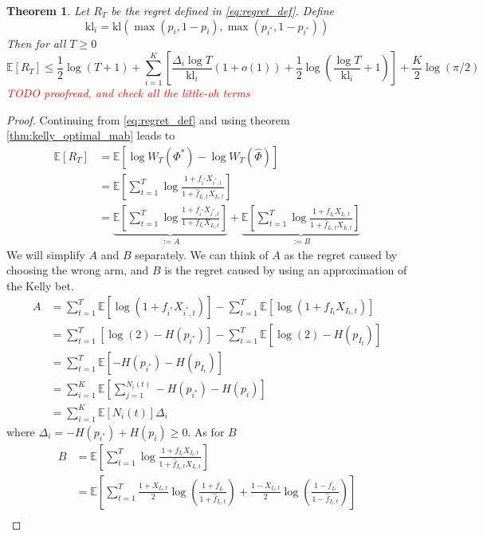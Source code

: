 \documentclass[letterpaper]{article}
\numberwithin{equation}{section}
\theoremstyle{plain}
\newtheorem{theorem}{Theorem}[section]
\begin{document}
\begin{theorem}
Let $R_T$ be the regret defined in \eqref{eq:regret_def}. Define
\begin{equation}
\text{kl}_i = \text{kl}(\max(p_i,1-p_i),\max(p_{i^*}, 1-p_{i^*}))
\end{equation}
Then for all $T\ge 0$
\begin{equation}
\mathbb{E}[R_T] \le \frac{1}{2}\log(T+1) + \sum_{i=1}^K \left[\frac{\Delta_i\log T}{\text{kl}_i}(1+o(1)) + \frac{1}{2} \log\left(\frac{\log T}{\text{kl}_i} + 1\right) \right] + \frac{K}{2} \log(\pi/2) 
\end{equation}
\textcolor{red}{TODO proofread, and check all the little-oh terms}
\end{theorem}
\begin{proof}
Continuing from \eqref{eq:regret_def} and using theorem \ref{thm:kelly_optimal_mab} leads to
\begin{align}
\mathbb{E}[R_T] &= \mathbb{E}\left[\log W_T(\Phi^*) - \log W_T(\hat{\Phi})\right]\\
&=\mathbb{E}\left[\sum_{t=1}^T \log \frac{1+f_{i^*}X_{i^*,t}}{1+\hat{f}_{I_t,t}X_{I_t,t}} \right]\\
&=\underbrace{\mathbb{E}\left[\sum_{t=1}^T \log \frac{1+f_{i^*}X_{i^*,t}}{1+f_{I_t} X_{I_t,t}}\right]}_{:=A} + \underbrace{\mathbb{E}\left[\sum_{t=1}^T \log \frac{1+f_{I_t}X_{I_t,t}}{1+\hat{f}_{I_t,t}X_{I_t,t}} \right]}_{:=B}
\end{align}
We will simplify $A$ and $B$ separately. We can think of $A$ as the regret caused by choosing the wrong arm, and $B$ is the regret caused by using an approximation of the Kelly bet.
\begin{align}
A &= \sum_{t=1}^T \mathbb{E}[\log(1+f_{i^*}X_{i^*,t})] - \sum_{t=1}^T \mathbb{E}[\log(1+f_{I_t} X_{I_t,t})]\\
&= \sum_{t=1}^T  [\log(2) - H(p_{i^*})] - \sum_{t=1}^T \mathbb{E}[\log(2) - H(p_{I_t})]\\
&= \sum_{t=1}^T \mathbb{E}[-H(p_{i^*}) - H(p_{I_t})]\\
&= \sum_{i=1}^K \mathbb{E}\left[\sum_{j=1}^{N_i(t)} -H(p_{i^*}) - H(p_i) \right]\\
&= \sum_{i=1}^K \mathbb{E}[N_i(t)] \Delta_i
\end{align}
where $\Delta_i = - H(p_{i^*}) + H(p_i) \ge 0$. As for $B$
\begin{align}
B &=\mathbb{E}\left[\sum_{t=1}^T \log \frac{1+f_{I_t}X_{I_t,t}}{1+\hat{f}_{I_t,t}X_{I_t,t}} \right]\\
&= \mathbb{E}\left[\sum_{t=1}^T\frac{1+X_{I_t,t}}{2} \log\left(\frac{1+f_{I_t}}{1+\hat{f}_{I_t,t}}\right) + \frac{1-X_{I_t,t}}{2}\log\left(\frac{1-f_{I_t}}{1-\hat{f}_{I_t,t}}\right) \right]\\

\end{align}
\end{proof}
\end{document}
